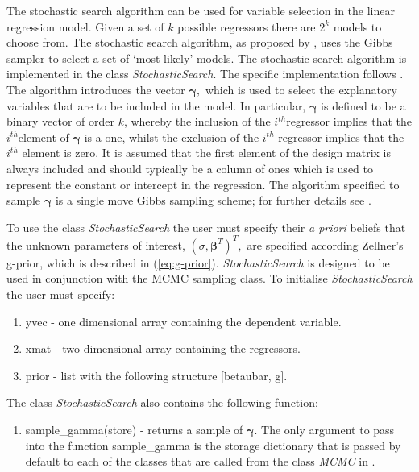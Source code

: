 \documentclass[article]{jss}
\begin{document}
The stochastic search algorithm can be used for variable selection in
the linear regression model. Given a set of $k$ possible regressors
there are $2^{k}$ models to choose from. The stochastic search
algorithm, as proposed by \citet{GeorgeMcCulloch1993}, uses the Gibbs
sampler to select a set of `most likely' models. The stochastic search
algorithm is implemented in the class \emph{StochasticSearch}. The
specific implementation follows \citet{MarinRobert2007}. The algorithm
introduces the vector $\bm{\gamma},$ which is used to select the
explanatory variables that are to be included in the model. In
particular, $\bm{\gamma}$ is defined to be a binary vector of order
$k$, whereby the inclusion of the $i^{th}$regressor implies that
the $i^{th}$element of $\bm{\gamma}$ is a one, whilst the exclusion of
the $i^{th}$ regressor implies that the $i^{th}$ element is zero.
It is assumed that the first element of the design matrix is always
included and should typically be a column of ones which is used to
represent the constant or intercept in the regression. The algorithm
specified to sample $\bm{\gamma}$ is a single move Gibbs sampling
scheme; for further details see \citet{MarinRobert2007}.

To use the class \emph{StochasticSearch }the user must specify their
\emph{a priori} beliefs that the unknown parameters of interest,
$(\sigma,\bm{\beta}^{T})^{T},$ are specified according Zellner's
g-prior, which is described in (\ref{eq:g-prior}).
\emph{StochasticSearch }is designed to be used in conjunction with the
MCMC sampling class. To initialise \emph{StochasticSearch} the user
must specify:
\begin{enumerate}
\item yvec - one dimensional  array containing the dependent variable. 
\item xmat - two dimensional  array containing the regressors. 
\item prior - list with the following structure {[}betaubar, g{]}.
\end{enumerate}
The class \emph{StochasticSearch} also contains the following function:
\begin{enumerate}
\item sample\_gamma(store) - returns a sample of $\bm{\gamma}.$ The
  only argument to pass into the function sample\_gamma is the storage
  dictionary that is passed by default to each of the classes that are
  called from the class \emph{MCMC }in .
\end{enumerate}
\end{document}

